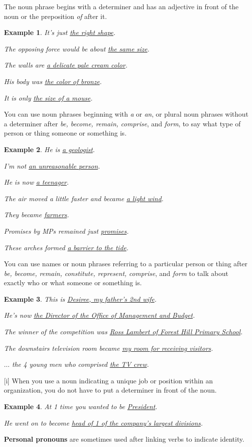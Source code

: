 \documentclass[oneside]{book}
\numberwithin{equation}{section}
\newtheorem{example}{Example}[section]
\begin{document}
The noun phrase begins with a determiner and has an adjective in front of the noun or the preposition \textit{of} after it.
\begin{example}
    It's just \underline{the right shape}.
    
    The opposing force would be about \underline{the same size}.
    
    The walls are \underline{a delicate pale cream color}.
    
    His body was \underline{the color of bronze}.
    
    It is only \underline{the size of a mouse}.
\end{example}
%
\noindent{} You can use noun phrases beginning with \textit{a} or \textit{an}, or plural noun phrases without a determiner after \textit{be, become, remain, comprise}, and \textit{form}, to say what type of person or thing someone or something is.
\begin{example}
    He is \underline{a geologist}.
    
    I'm not \underline{an unreasonable person}.
    
    He is now \underline{a teenager}.
    
    The air moved a little faster and became \underline{a light wind}.
    
    They became \underline{farmers}.
    
    Promises by MPs remained just \underline{promises}.
    
    These arches formed \underline{a barrier to the tide}.
\end{example}
%
\noindent{} You can use names or noun phrases referring to a particular person or thing after \textit{be, become, remain, constitute, represent, comprise}, and \textit{form} to talk about exactly who or what someone or something is.
\begin{example}
    This is \underline{Desiree, my father's 2nd wife}.
    
    He's now \underline{the Director of the Office of Management and Budget}.
    
    The winner of the competition was \underline{Ross Lambert of Forest Hill Primary School}.
    
    The downstairs television room became \underline{my room for receiving visitors}.
    
    $\ldots$ the 4 young men who comprised \underline{the TV crew}.
\end{example}
%
\noindent{} [i] When you use a noun indicating a unique job or position within an organization, you do not have to put a determiner in front of the noun.
\begin{example}
    At 1 time you wanted to be \underline{President}.
    
    He went on to become \underline{head of 1 of the company's largest divisions}.
\end{example}
%
\noindent{} \textbf{Personal pronouns} are sometimes used after linking verbs to indicate identity.
\end{document}

